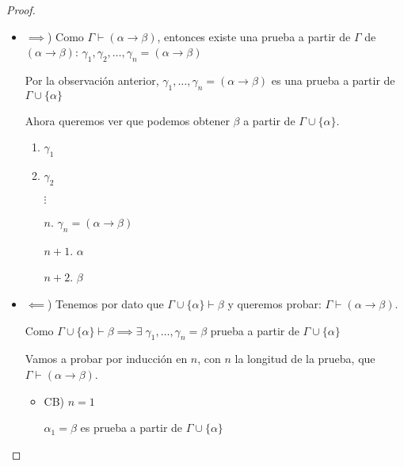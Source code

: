 \begin{proof} \phantom{.}

    \begin{itemize}
        \item $\implies$) Como $\Gamma \vdash (\alpha\to\beta)$, entonces
            existe una prueba a partir de $\Gamma$
            de $(\alpha\to\beta)$:
            $\gamma_1, \gamma_2, \dotsc, \gamma_n = (\alpha\to\beta)$

            Por la observación anterior, 
            $\gamma_1, \dotsc, \gamma_n=(\alpha\to\beta)$ es una prueba
            a partir de $\Gamma \cup \{ \alpha \}$

            Ahora queremos ver que podemos obtener $\beta$ a partir de 
            $\Gamma \cup \{ \alpha \}$.
            \begin{enumerate}
                \item $\gamma_1$
                \item $\gamma_2$
                \item[$\vdots$]
                \item[$n$.] $\gamma_n = (\alpha \to \beta)$
                \item[$n+1$.] $\alpha$ 

                \item[$n+2$.] $\beta$ %
            \end{enumerate}

        \item $\impliedby$) Tenemos por dato que
            $\Gamma \cup \{ \alpha \}\vdash \beta$ y queremos probar:
            $\Gamma \vdash (\alpha \to \beta)$.

            Como $\Gamma \cup \{ \alpha \} \vdash \beta \implies
            \exists \; \gamma_1, \dotsc, \gamma_n = \beta$ prueba a partir
            de $\Gamma \cup \{ \alpha \}$

            Vamos a probar por inducción en $n$, con $n$ la longitud de la
            prueba, que $\Gamma \vdash (\alpha \to \beta)$.


            \begin{itemize}
                \item CB) $n=1$

                    $\alpha_1 = \beta$ es prueba a partir de 
                    $\Gamma \cup \{ \alpha \}$



\end{itemize}
\end{itemize}
\end{proof}
